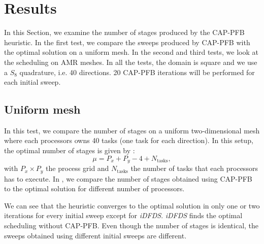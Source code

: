 \documentclass{mc2015}
\renewcommand{\(}{\left(}
\renewcommand{\)}{\right)}
\renewcommand{\[}{\left[}
\renewcommand{\]}{\right]}
\begin{document}
\section{Results} \label{results}

In this Section, we examine the number of stages produced by the CAP-PFB
heuristic. In the first test, we compare the sweeps produced by CAP-PFB
with the optimal solution on a uniform mesh. In the second and third tests, we
look at the scheduling on AMR meshes. In all the tests, the domain is square and
we use a $S_8$ quadrature, i.e. 40 directions. 20 CAP-PFB iterations will be
performed for each initial sweep.

\subsection{Uniform mesh}

In this test, we compare the number of stages on a uniform two-dimensional mesh 
where each processors owns 40 tasks (one task for each direction). In this
setup, the optimal number of stages is given by \cite{Adams2013}:
\begin{equation}
  \mu = P_x + P_y - 4 + N_{\textrm{tasks}},
\end{equation}
with $P_x \times P_y$ the process grid and $N_{\textrm{tasks}}$ the number of
tasks that each processors has to execute. In , we compare the number of
stages obtained using CAP-PFB to the optimal solution for different number of
processors.

We can see that the heuristic converges to the optimal solution in only one or
two iterations for every initial sweep except for \emph{iDFDS}. \emph{iDFDS} 
finds the optimal scheduling without CAP-PFB. Even though the number of stages is
identical, the sweeps obtained using different initial sweeps are
different.
\end{document}
